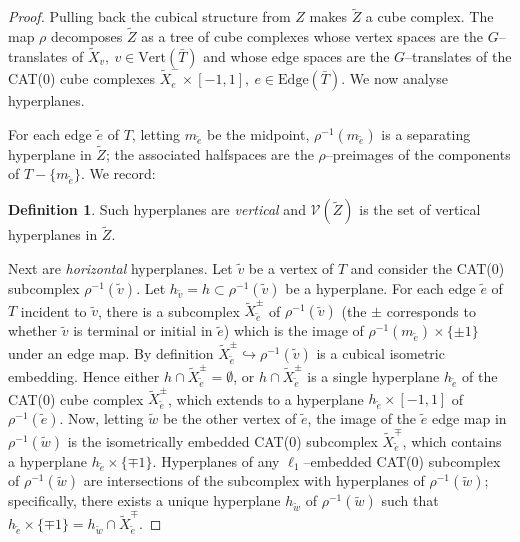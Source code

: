 \documentclass[11pt,oneside]{amsart}
\theoremstyle{definition}
\newtheorem{defn}[thm]{Definition}
\newcommand{\vertices}{\mathrm{Vert}}
\newcommand{\edges}{\mathrm{Edge}}
\begin{document}
\begin{proof}
Pulling back the cubical structure from $Z$ makes $\widetilde Z$ a cube complex.  The map $\rho$ decomposes $\widetilde Z$ as a tree of cube complexes whose vertex spaces are the $G$--translates of $\widetilde X_v,\ v\in\vertices(\bar T)$ and whose edge spaces are the $G$--translates of the CAT(0) cube complexes $\widetilde X_e^-\times[-1,1],\ e\in\edges(\bar T)$.  We now analyse hyperplanes.

For each edge $\tilde e$ of $T$, letting $m_{\tilde e}$ be the midpoint, $\rho^{-1}(m_{\tilde e})$ is a separating hyperplane in $\widetilde Z$; the associated halfspaces are the $\rho$--preimages of the components of $T-\{m_{\tilde e}\}$.  We record:    

\begin{defn}\label{defn:vertical-Z-wall}
Such hyperplanes are \emph{vertical} and $\mathcal V(\widetilde Z)$ is the set of vertical hyperplanes in $\widetilde Z$.    
\end{defn}


Next are \emph{horizontal} hyperplanes.  Let $\tilde v$ be a vertex of $T$ and consider the CAT(0) subcomplex $\rho^{-1}(\tilde v)$.  Let $h_{\tilde v}=h\subset \rho^{-1}(\tilde v)$ be a hyperplane.  For each edge $\tilde e$ of $T$ incident to $\tilde v$, there is a subcomplex $\widetilde X_{\tilde e}^\pm$ of $\rho^{-1}(\tilde v)$ (the $\pm$ corresponds to whether $\tilde v$ is terminal or initial in $\tilde e$) which is the image of $\rho^{-1}(m_{\tilde e})\times \{\pm 1\}$ under an edge map. By definition $\widetilde X_{\tilde e}^\pm\hookrightarrow\rho^{-1}(\tilde v)$ is a cubical isometric embedding.  Hence either $h\cap\widetilde X_{\tilde e}^\pm=\emptyset$, or $h\cap\widetilde X_{\tilde e}^\pm$ is a single hyperplane $h_{\tilde e}$ of the CAT(0) cube complex $\widetilde X_{\tilde e}^\pm$, which extends to a hyperplane $h_{\tilde e}\times[-1,1]$ of $\rho^{-1}(\tilde e)$.  Now, letting $\tilde w$ be the other vertex of $\tilde e$, the image of the $\tilde e$ edge map in $\rho^{-1}(\tilde w)$ is the isometrically embedded CAT(0) subcomplex $\widetilde X_{\tilde e}^\mp$, which contains a hyperplane $h_{\tilde e}\times\{\mp1\}$.  Hyperplanes of any $\ell_1$--embedded CAT(0) subcomplex of $\rho^{-1}(\tilde w)$ are intersections of the subcomplex with hyperplanes of $\rho^{-1}(\tilde w)$; specifically, there exists a unique hyperplane $h_{\tilde w}$ of $\rho^{-1}(\tilde w)$ such that $h_{\tilde e}\times\{\mp 1\}=h_{\tilde w}\cap \widetilde X_{\tilde e}^\mp$.


\end{proof}
\end{document}
